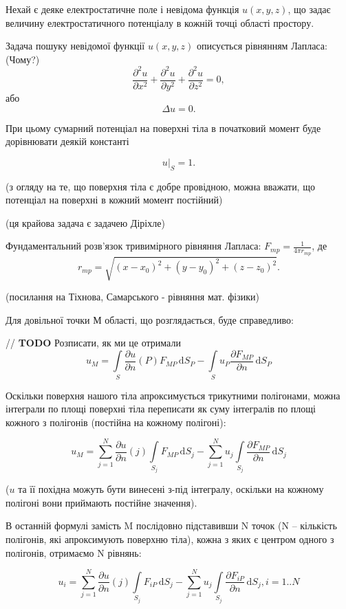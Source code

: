 \documentclass[a4paper,12pt]{article}
\begin{document}
Нехай є деяке електростатичне поле і невідома функція $u(x,y,z)$, що задає величину електростатичного потенціалу в кожній точці області простору.

Задача пошуку невідомої функції $u(x,y,z)$ описується рівнянням Лапласа: (Чому?)
\[
\frac{\partial ^2 u}{\partial x^2} + \frac{\partial ^2 u}{\partial y^2} + \frac{\partial ^2 u}{\partial z^2} = 0,
\] або
\[
\Delta u = 0.
\]

При цьому сумарний потенціал на поверхні тіла в початковий момент буде дорівнювати деякій константі

\[
\left.u\right|_S = 1.
\]

(з огляду на те, що поверхня тіла є добре провідною, можна вважати, що потенціал на поверхні в кожний момент постійний)


(ця крайова задача є задачею Діріхле)

Фундаментальний розв’язок тривимірного рівняння Лапласа: $F_{mp} = \frac{1}{4\pi r_{mp}}$, де \[r_{mp} = \sqrt{(x - x_0)^2 + (y - y_0)^2 + (z - z_0)^2}.\]

(посилання на Тіхнова, Самарського - рівняння мат. фізики)

Для довільної точки М області, що розглядається, буде справедливо:

// \textbf{TODO} Розписати, як ми це отримали
\[
u_M = \int\limits_S \frac{\partial u}{\partial n}(P) F_{MP} \, \mathrm{d}S_P - \int\limits_S u_P \frac{\partial F_{MP}}{\partial n} \, \mathrm{d}S_P
\]

Оскільки поверхня нашого тіла апроксимується трикутними полігонами, можна інтеграли по площі поверхні тіла переписати як суму інтегралів по площі кожного з полігонів (постійна на кожному полігоні):

\begin{equation} \label{eq:triangulated_equation}
u_M = \sum_{j=1}^{N} \frac{\partial u}{\partial n}(j) \int\limits_{S_j} F_{MP} \, \mathrm{d}S_j - \sum_{j=1}^{N} u_j \int\limits_{S_j} \frac{\partial F_{MP}}{\partial n} \, \mathrm{d}S_j
\end{equation}

($u$ та її похідна можуть бути винесені з-під інтегралу, оскільки на кожному полігоні вони приймають постійне значення).

В останній формулі замість M послідовно підставивши N точок (N -- кількість полігонів, які апроксимують поверхню тіла), кожна з яких є центром одного з полігонів, отримаємо N рівнянь:

\[
u_i = \sum_{j=1}^{N} \frac{\partial u}{\partial n}(j) \int\limits_{S_j} F_{iP} \, \mathrm{d}S_j - \sum_{j=1}^{N} u_j \int\limits_{S_j} \frac{\partial F_{iP}}{\partial n} \, \mathrm{d}S_j, i = 1..N
\]
\end{document}
